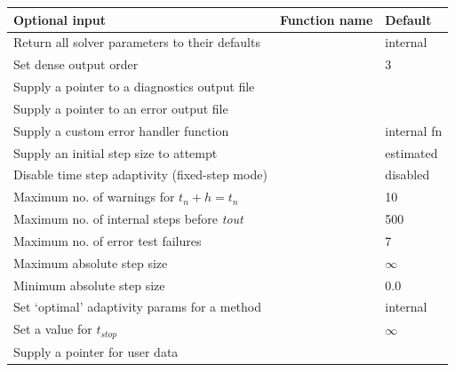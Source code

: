 \documentclass[letterpaper,10pt,english]{sphinxmanual}
\begin{document}
\begin{tabulary}{\linewidth}{|L|L|L|}
\hline
\textsf{\relax 
Optional input
} & \textsf{\relax 
Function name
} & \textsf{\relax 
Default
}\\
\hline
Return all solver parameters to their defaults
 & 
{\hyperref[c_interface/User_callable:c.ARKodeSetDefaults]{\emph{}}}
 & 
internal
\\
\hline
Set dense output order
 & 
{\hyperref[c_interface/User_callable:c.ARKodeSetDenseOrder]{\emph{}}}
 & 
3
\\
\hline
Supply a pointer to a diagnostics output file
 & 
{\hyperref[c_interface/User_callable:c.ARKodeSetDiagnostics]{\emph{}}}
 & 
\\
\hline
Supply a pointer to an error output file
 & 
{\hyperref[c_interface/User_callable:c.ARKodeSetErrFile]{\emph{}}}
 & 
\\
\hline
Supply a custom error handler function
 & 
{\hyperref[c_interface/User_callable:c.ARKodeSetErrHandlerFn]{\emph{}}}
 & 
internal fn
\\
\hline
Supply an initial step size to attempt
 & 
{\hyperref[c_interface/User_callable:c.ARKodeSetInitStep]{\emph{}}}
 & 
estimated
\\
\hline
Disable time step adaptivity (fixed-step mode)
 & 
{\hyperref[c_interface/User_callable:c.ARKodeSetFixedStep]{\emph{}}}
 & 
disabled
\\
\hline
Maximum no. of warnings for \(t_n+h = t_n\)
 & 
{\hyperref[c_interface/User_callable:c.ARKodeSetMaxHnilWarns]{\emph{}}}
 & 
10
\\
\hline
Maximum no. of internal steps before \emph{tout}
 & 
{\hyperref[c_interface/User_callable:c.ARKodeSetMaxNumSteps]{\emph{}}}
 & 
500
\\
\hline
Maximum no. of error test failures
 & 
{\hyperref[c_interface/User_callable:c.ARKodeSetMaxErrTestFails]{\emph{}}}
 & 
7
\\
\hline
Maximum absolute step size
 & 
{\hyperref[c_interface/User_callable:c.ARKodeSetMaxStep]{\emph{}}}
 & 
\(\infty\)
\\
\hline
Minimum absolute step size
 & 
{\hyperref[c_interface/User_callable:c.ARKodeSetMinStep]{\emph{}}}
 & 
0.0
\\
\hline
Set `optimal' adaptivity params for a method
 & 
{\hyperref[c_interface/User_callable:c.ARKodeSetOptimalParams]{\emph{}}}
 & 
internal
\\
\hline
Set a value for \(t_{stop}\)
 & 
{\hyperref[c_interface/User_callable:c.ARKodeSetStopTime]{\emph{}}}
 & 
\(\infty\)
\\
\hline
Supply a pointer for user data
 & 
{\hyperref[c_interface/User_callable:c.ARKodeSetUserData]{\emph{}}}
 & 
\\
\hline\end{tabulary}
\end{document}
